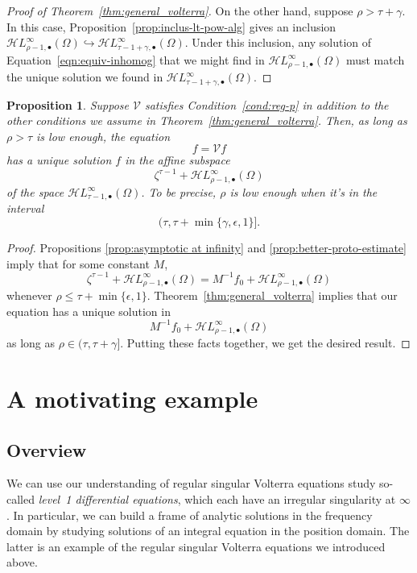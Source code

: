 \documentclass{article}
\theoremstyle{plain}
\newtheorem{prop}{Proposition}
\newcommand{\singexp}[2]{\mathcal{H}L^\infty_{#1, #2}}
\newcommand{\singexpalg}[1]{\singexp{#1}{\bullet}}
\newcommand{\volterra}{\mathcal{V}}
\newcommand{\solproto}{f_0}
\newcommand{\domain}{\Omega}
\begin{document}
\begin{proof}[Proof of Theorem~\ref{thm:general_volterra}]
On the other hand, suppose $\rho > \tau+\gamma$. In this case, Proposition~\ref{prop:inclus-lt-pow-alg} gives an inclusion $\singexpalg{\rho-1}(\Omega) \hookrightarrow \singexpalg{\tau-1+\gamma}(\Omega)$. Under this inclusion, any solution of Equation~\eqref{eqn:equiv-inhomog} that we might find in $\singexpalg{\rho-1}(\Omega)$ must match the unique solution we found in $\singexpalg{\tau-1+\gamma}(\Omega)$.
\end{proof}
\begin{prop}\label{prop:alt-general_volterra}
Suppose $\volterra$ satisfies {\em Condition~\eqref{cond:reg-p}} in addition to the other conditions we assume in {\em Theorem~\ref{thm:general_volterra}}. Then, as long as $\rho > \tau$ is low enough, the equation
\[f = \volterra f\]
has a unique solution $f$ in the affine subspace
\[ \zeta^{\tau-1}+\singexpalg{\rho-1}(\domain) \]
of the space $\singexpalg{\tau-1}(\domain)$. To be precise, $\rho$ is low enough when it's in the interval
\[ (\tau, \tau + \min\{\gamma, \epsilon, 1\}]. \]
\end{prop}

\begin{proof}
Propositions \ref{prop:asymptotic at infinity} and \ref{prop:better-proto-estimate} imply that for some constant $M$,
\[ \zeta^{\tau-1} + \singexpalg{\rho-1}(\domain) = M^{-1}\solproto + \singexpalg{\rho-1}(\domain) \]
whenever $\rho \le \tau + \min\{\epsilon, 1\}$. Theorem~\ref{thm:general_volterra} implies that our equation has a unique solution in
\[ M^{-1}\solproto + \singexpalg{\rho-1}(\domain) \]
as long as $\rho \in (\tau, \tau + \gamma]$. Putting these facts together, we get the desired result.
\end{proof}

\section{A motivating example}\label{sec:example}
\subsection{Overview}
We can use our understanding of regular singular Volterra equations study so-called \textit{level~1 differential equations}, which each have an irregular singularity at $\infty$. In particular, we can build a frame of analytic solutions in the frequency domain by studying solutions of an integral equation in the position domain. The latter is an example of the regular singular Volterra equations we introduced above.
\end{document}
